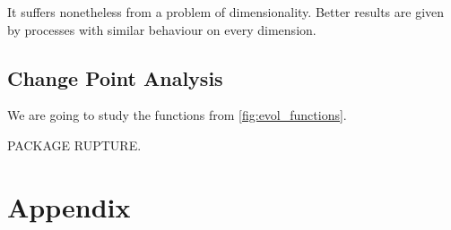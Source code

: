 \documentclass[11pt]{book}
\begin{document}
It suffers nonetheless from a problem of dimensionality. Better results are given by processes with similar behaviour on every dimension.




































\chapter{Change Point Analysis}
\label{chap:change_point}

We are going to study the functions from \ref{fig:evol_functions}.

PACKAGE RUPTURE.












































\cleardoublepage%

\appendix
\pagestyle{back}




\part{Appendix}





\backmatter

\printbibliography
\nocite{*}



\tableofcontents%
\end{document}
